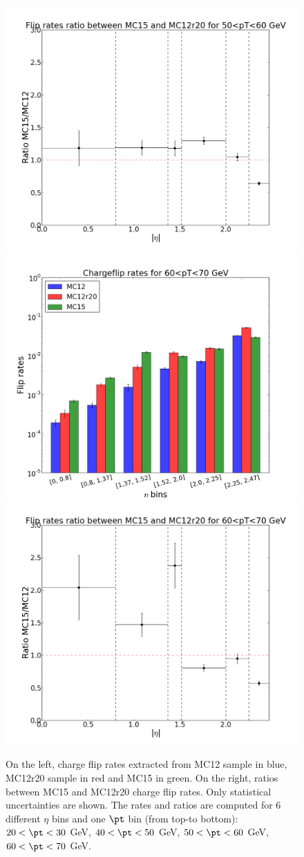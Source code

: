 \begin{figure}[!htbp]
\includegraphics[width=0.33\linewidth]{FIGURES/BKG/chargeFlip/APPENDIX/ratio_MC15vsMC12r20/ratio_plot_50.png}
\vfill
\includegraphics[width=0.33\linewidth]{FIGURES/BKG/chargeFlip/APPENDIX/fliprates_MC12r20/fliprates_3samples_60.png}
\includegraphics[width=0.33\linewidth]{FIGURES/BKG/chargeFlip/APPENDIX/ratio_MC15vsMC12r20/ratio_plot_60.png}
\caption{\label{fig:12r20vs15_2030} On the left, charge flip rates extracted from MC12 sample in blue, MC12r20 sample in red and MC15 in green. On the right, ratios between MC15 and MC12r20 charge flip rates. Only statistical uncertainties are shown.
The rates and ratios are computed for 6 different $\eta$ bins and one $\pt$ bin (from top-to bottom): $20<\pt<30$ GeV, $40<\pt<50$ GeV, $50<\pt<60$ GeV, $60<\pt<70$ GeV.}
\end{figure}


